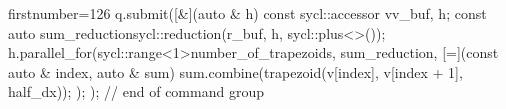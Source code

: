 \begin{cppcode*}{firstnumber=126}
        q.submit([&](auto & h) {
            const sycl::accessor v{v_buf, h};
            const auto sum_reduction{sycl::reduction(r_buf, h, sycl::plus<>())};
            h.parallel_for(sycl::range<1>{number_of_trapezoids}, sum_reduction, [=](const auto & index, auto & sum) {
                sum.combine(trapezoid(v[index], v[index + 1], half_dx));
            });
        }); // end of command group
\end{cppcode*}
